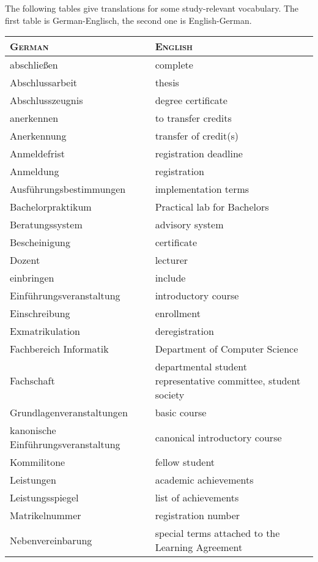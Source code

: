 
The following tables give translations for some study-relevant vocabulary.
The first table is German-Englisch, the second one is English-German.

\begin{longtable} {|p{.5\linewidth}|p{.5\linewidth}|}
\hline
\textsc{German} & \textsc{English}\\
\hline
\hline
abschließen & complete \\
\hline
Abschlussarbeit & thesis\\
\hline
Abschlusszeugnis & degree certificate\\
\hline
anerkennen & to transfer credits\\
\hline
Anerkennung & transfer of credit(s)\\
\hline
Anmeldefrist & registration deadline\\
\hline
Anmeldung & registration\\
\hline
Ausführungsbestimmungen & implementation terms\\
\hline
Bachelorpraktikum & Practical lab for Bachelors\\
\hline
Beratungssystem & advisory system\\
\hline
Bescheinigung & certificate\\
\hline
Dozent & lecturer\\
\hline
einbringen & include\\
\hline
Einführungsveranstaltung & introductory course\\
\hline
Einschreibung & enrollment\\
\hline
Exmatrikulation & deregistration\\
\hline
Fachbereich Informatik & Department of Computer Science\\
\hline
Fachschaft & departmental student representative committee, student society\\
\hline
Grundlagenveranstaltungen & basic course\\
\hline
kanonische Einführungsveranstaltung & canonical introductory course\\
\hline
Kommilitone & fellow student\\
\hline
Leistungen & academic achievements\\
\hline
Leistungsspiegel & list of achievements\\
\hline
Matrikelnummer & registration number\\
\hline
Nebenvereinbarung & special terms attached to the Learning Agreement\\

\end{longtable}
